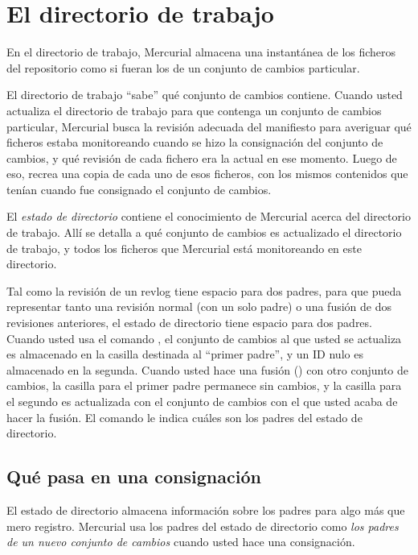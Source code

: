 \section{El directorio de trabajo}

En el directorio de trabajo, Mercurial almacena una instantánea de los
ficheros  del repositorio como si fueran los de un conjunto de cambios
particular.

El directorio de trabajo ``sabe'' qué conjunto de cambios contiene.
Cuando usted actualiza el directorio de trabajo para que contenga un
conjunto de cambios particular, Mercurial busca la revisión adecuada
del manifiesto para averiguar qué ficheros estaba monitoreando cuando
se hizo la consignación del conjunto de cambios, y qué revisión de
cada fichero era la actual en ese momento. Luego de eso, recrea una
copia de cada uno de esos ficheros, con los mismos contenidos que
tenían cuando fue consignado el conjunto de cambios.

El \emph{estado de directorio} contiene el conocimiento de Mercurial acerca del directorio
de trabajo. Allí se detalla a qué conjunto de cambios es actualizado
el directorio de trabajo, y todos los ficheros que Mercurial está
monitoreando en este directorio.

Tal como la revisión de un revlog tiene espacio para dos padres, para
que pueda representar tanto una revisión normal (con un solo padre) o
una fusión de dos revisiones anteriores, el estado de directorio tiene
espacio para dos padres. Cuando usted usa el comando ,
el conjunto de cambios al que usted se actualiza es almacenado en la
casilla destinada al ``primer padre'', y un ID nulo es almacenado en
la segunda. Cuando usted hace una fusión () con otro
conjunto de cambios, la casilla para el primer padre permanece sin
cambios, y la casilla para el segundo es actualizada con el conjunto
de cambios con el que usted acaba de hacer la fusión. El comando
 le indica cuáles son los padres del estado de
directorio.

\subsection{Qué pasa en una consignación}

El estado de directorio almacena información sobre los padres para
algo más que mero registro. Mercurial usa los padres del estado de
directorio como \emph{los padres de un nuevo conjunto de cambios}
cuando usted hace una consignación.

